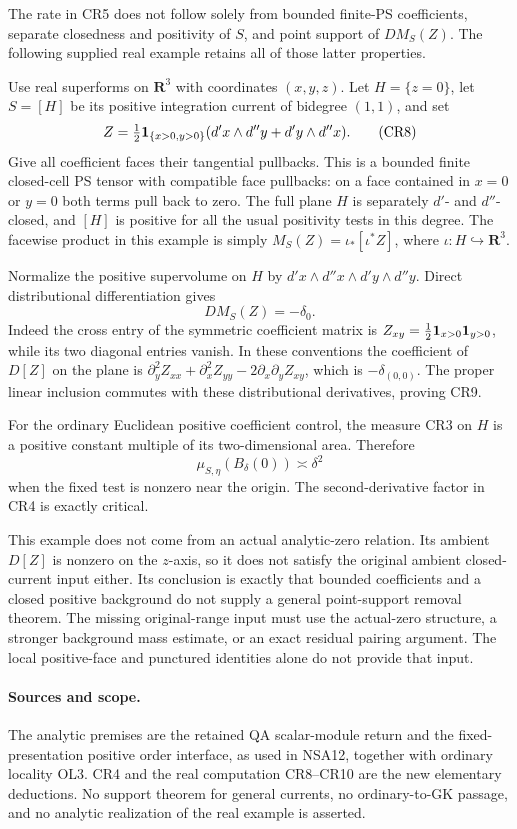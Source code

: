 The rate in CR5 does not follow solely from bounded finite-PS
coefficients, separate closedness and positivity of \(S\),
and point support of \(D M_S(Z)\).  The following supplied
real example retains all of those latter properties.

Use real superforms on \(\mathbf R^3\) with coordinates
\((x,y,z)\).  Let \(H=\{z=0\}\), let \(S=[H]\) be its
positive integration current of bidegree \((1,1)\), and set
\[
 Z=\tfrac12{\bf1}_{\{x>0,y>0\}}
                   (d'x\wedge d''y+d'y\wedge d''x).
\tag{CR8}
\]
Give all coefficient faces their tangential pullbacks.  This
is a bounded finite closed-cell PS tensor with compatible
face pullbacks: on a face contained in \(x=0\) or \(y=0\)
both terms pull back to zero.  The full plane \(H\) is
separately \(d'\)- and \(d''\)-closed, and \([H]\) is
positive for all the usual positivity tests in this degree.
The facewise product in this example is simply
\(M_S(Z)=\iota_*[\iota^*Z]\), where \(\iota:H\hookrightarrow
\mathbf R^3\).

Normalize the positive supervolume on \(H\) by
\(d'x\wedge d''x\wedge d'y\wedge d''y\).  Direct
distributional differentiation gives
\[
               D M_S(Z)=-\delta_0.
\tag{CR9}
\]
Indeed the cross entry of the symmetric coefficient matrix
is \(Z_{xy}=\tfrac12{\bf1}_{x>0}{\bf1}_{y>0}\), while
its two diagonal entries vanish.  In these conventions the
coefficient of \(D[Z]\) on the plane is
\(\partial_y^2 Z_{xx}+\partial_x^2Z_{yy}
             -2\partial_x\partial_y Z_{xy}\), which is
\(-\delta_{(0,0)}\).  The proper linear inclusion commutes
with these distributional derivatives, proving CR9.

For the ordinary Euclidean positive coefficient control,
the measure CR3 on \(H\) is a positive constant multiple
of its two-dimensional area.  Therefore
\[
                   \mu_{S,\eta}(B_\delta(0))\asymp\delta^2
\tag{CR10}
\]
when the fixed test is nonzero near the origin.  The
second-derivative factor in CR4 is exactly critical.

This example does not come from an actual analytic-zero
relation.  Its ambient \(D[Z]\) is nonzero on the
\(z\)-axis, so it does not satisfy the original ambient
closed-current input either.  Its conclusion is exactly
that bounded coefficients and a closed positive background
do not supply a general point-support removal theorem.
The missing original-range input must use the actual-zero
structure, a stronger background mass estimate, or an exact
residual pairing argument.  The local positive-face and
punctured identities alone do not provide that input.

\paragraph{Sources and scope.}
The analytic premises are the retained QA scalar-module
return and the fixed-presentation positive order interface,
as used in NSA12, together with ordinary locality OL3.
CR4 and the real computation CR8--CR10 are the new elementary
deductions.  No support theorem for general currents, no
ordinary-to-GK passage, and no analytic realization of the
real example is asserted.
